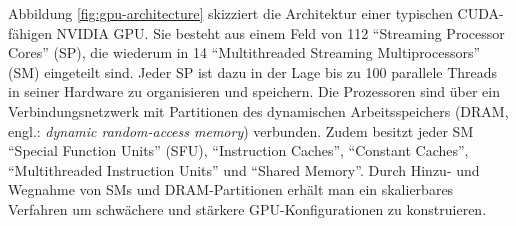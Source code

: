 \documentclass[crop=false]{standalone}
\begin{document}
        Abbildung \ref{fig:gpu-architecture} skizziert die Architektur einer typischen CUDA-fähigen NVIDIA GPU.
        Sie besteht aus einem Feld von 112 \enquote{Streaming Processor Cores} (SP), die wiederum in 14 \enquote{Multithreaded Streaming Multiprocessors} (SM) eingeteilt sind.
        Jeder SP ist dazu in der Lage bis zu 100 parallele Threads in seiner Hardware zu organisieren und speichern.
        Die Prozessoren sind über ein Verbindungsnetzwerk mit Partitionen des dynamischen Arbeitsspeichers (DRAM, engl.: \textit{dynamic random-access memory}) verbunden.
        Zudem besitzt jeder SM \enquote{Special Function Units} (SFU), \enquote{Instruction Caches}, \enquote{Constant Caches}, \enquote{Multithreaded Instruction Units} und \enquote{Shared Memory}.
        Durch Hinzu- und Wegnahme von SMs und DRAM-Partitionen erhält man ein skalierbares Verfahren um schwächere und stärkere GPU-Konfigurationen zu konstruieren.

\end{document}
